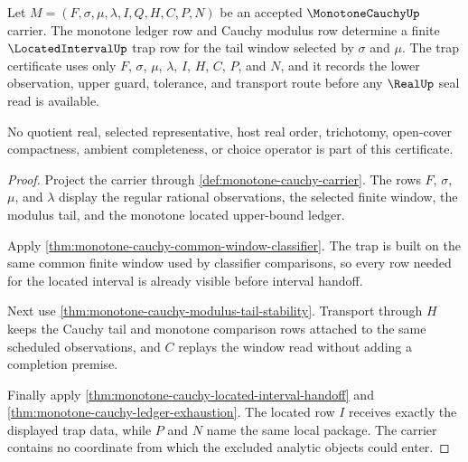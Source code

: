 \begin{theorem}
\label{thm:monotone-cauchy-located-trap-certificate}
Let $M=(F,\sigma,\mu,\lambda,I,Q,H,C,P,N)$ be an accepted $\MonotoneCauchyUp$ carrier. The monotone ledger row and Cauchy modulus row determine a finite $\LocatedIntervalUp$ trap row for the tail window selected by $\sigma$ and $\mu$. The trap certificate uses only $F$, $\sigma$, $\mu$, $\lambda$, $I$, $H$, $C$, $P$, and $N$, and it records the lower observation, upper guard, tolerance, and transport route before any $\RealUp$ seal read is available.

No quotient real, selected representative, host real order, trichotomy, open-cover compactness, ambient completeness, or choice operator is part of this certificate.
\end{theorem}
\begin{proof}
Project the carrier through \autoref{def:monotone-cauchy-carrier}. The rows $F$, $\sigma$, $\mu$, and $\lambda$ display the regular rational observations, the selected finite window, the modulus tail, and the monotone located upper-bound ledger.

Apply \autoref{thm:monotone-cauchy-common-window-classifier}. The trap is built on the same common finite window used by classifier comparisons, so every row needed for the located interval is already visible before interval handoff.

Next use \autoref{thm:monotone-cauchy-modulus-tail-stability}. Transport through $H$ keeps the Cauchy tail and monotone comparison rows attached to the same scheduled observations, and $C$ replays the window read without adding a completion premise.

Finally apply \autoref{thm:monotone-cauchy-located-interval-handoff} and \autoref{thm:monotone-cauchy-ledger-exhaustion}. The located row $I$ receives exactly the displayed trap data, while $P$ and $N$ name the same local package. The carrier contains no coordinate from which the excluded analytic objects could enter.
\end{proof}

